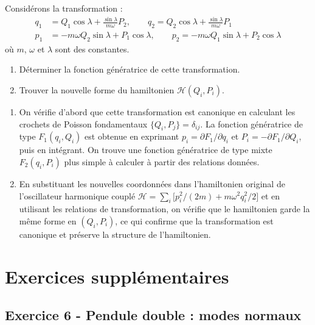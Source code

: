 \documentclass[12pt,a4paper]{article}
\begin{document}
\begin{boiteexercice}
Considérons la transformation :
\begin{align*}
  q_1 &= Q_1\cos\lambda + \frac{\sin\lambda}{m\omega}P_2, \qquad
  q_2 = Q_2\cos\lambda + \frac{\sin\lambda}{m\omega}P_1 \\
  p_1 &= -m\omega Q_2\sin\lambda + P_1\cos\lambda, \qquad
  p_2 = -m\omega Q_1\sin\lambda + P_2\cos\lambda
\end{align*}
où $m$, $\omega$ et $\lambda$ sont des constantes.
\begin{enumerate}
  \item Déterminer la fonction génératrice de cette transformation.
  \item Trouver la nouvelle forme du hamiltonien $\mathcal{H}(Q_i,P_i)$.
\end{enumerate}
\end{boiteexercice}

\begin{boitecorrige}
\begin{enumerate}
  \item On vérifie d'abord que cette transformation est canonique en calculant les crochets de Poisson fondamentaux $\{Q_i, P_j\} = \delta_{ij}$. La fonction génératrice de type $F_1(q_i, Q_i)$ est obtenue en exprimant $p_i = \partial F_1/\partial q_i$ et $P_i = -\partial F_1/\partial Q_i$, puis en intégrant. On trouve une fonction génératrice de type mixte $F_2(q_i, P_i)$ plus simple à calculer à partir des relations données.

  \item En substituant les nouvelles coordonnées dans l'hamiltonien original de l'oscillateur harmonique couplé $\mathcal{H} = \sum_i\bigl[p_i^2/(2m) + m\omega^2 q_i^2/2\bigr]$ et en utilisant les relations de transformation, on vérifie que le hamiltonien garde la même forme en $(Q_i, P_i)$, ce qui confirme que la transformation est canonique et préserve la structure de l'hamiltonien.
\end{enumerate}
\end{boitecorrige}


\newpage
\section{Exercices supplémentaires}

\subsection*{Exercice 6 - Pendule double : modes normaux \niveau{\difficile}}
\end{document}
